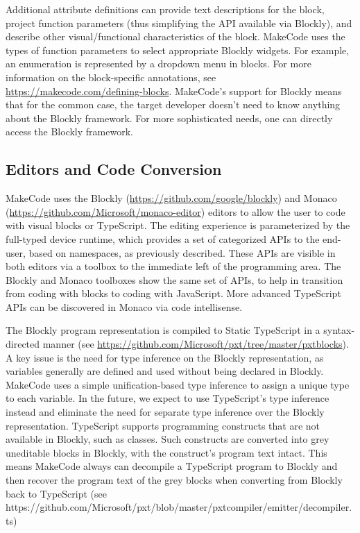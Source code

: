 Additional attribute definitions can provide text descriptions for the block, project function
parameters (thus simplifying the API available via Blockly), and describe other visual/functional
characteristics of the block.  MakeCode uses the types of function parameters to select appropriate
Blockly widgets.  For example, an enumeration is represented by a dropdown menu in blocks.
For more information on the block-specific annotations, see 
\url{https://makecode.com/defining-blocks}. 
MakeCode's support for Blockly means that for the common case, the target developer doesn't need
to know anything about the Blockly framework.  For more sophisticated needs, one can directly access
the Blockly framework. 

\subsection{Editors and Code Conversion}

MakeCode uses the Blockly (\url{https://github.com/google/blockly}) and Monaco 
(\url{https://github.com/Microsoft/monaco-editor}) editors to allow the user to code with
visual blocks or TypeScript. The editing experience is parameterized by the full-typed device
runtime, which provides a set of categorized APIs to the end-user, based on namespaces, as
previously described. These APIs are visible in both editors via a toolbox to the immediate
left of the programming area. The Blockly and Monaco toolboxes show the same set of APIs, to
help in transition from coding with blocks to coding with JavaScript. More advanced TypeScript
APIs can be discovered in Monaco via code intellisense.

The Blockly program representation is compiled to Static TypeScript in a syntax-directed manner
(see \url{https://github.com/Microsoft/pxt/tree/master/pxtblocks}). A key issue is the need for
type inference on the Blockly representation, as variables generally are defined and used without
being declared in Blockly. MakeCode uses a simple unification-based type inference to assign a
unique type to each variable.  In the future, we expect to use TypeScript's type inference instead
and eliminate the need for separate type inference over the Blockly representation. 
TypeScript supports programming constructs that are not available in Blockly, such as classes.
Such constructs are converted into grey uneditable blocks in Blockly, with the construct's program
text intact. This means MakeCode always can decompile a TypeScript program to Blockly and then recover
the program text of the grey blocks when converting from Blockly back to TypeScript
 (see https://github.com/Microsoft/pxt/blob/master/pxtcompiler/emitter/decompiler.ts) 

